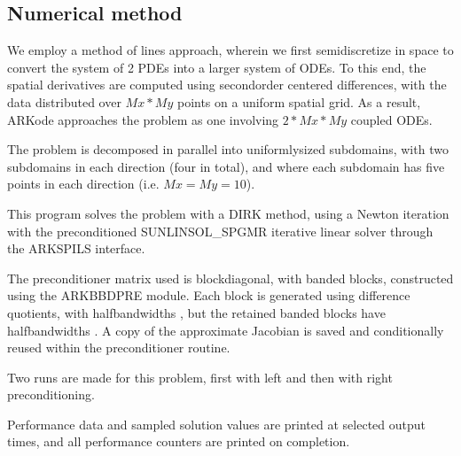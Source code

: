 \documentclass[letterpaper,10pt,english]{sphinxmanual}
\begin{document}
\subsection{Numerical method}
\label{\detokenize{c_parallel:numerical-method}}
\sphinxAtStartPar
We employ a method of lines approach, wherein we first
semi\sphinxhyphen{}discretize in space to convert the system of 2 PDEs into a larger
system of ODEs.  To this end, the spatial derivatives are computed
using second\sphinxhyphen{}order centered differences, with the data distributed
over \(Mx*My\) points on a uniform spatial grid.  As a result, ARKode
approaches the problem as one involving \(2*Mx*My\) coupled ODEs.

\sphinxAtStartPar
The problem is decomposed in parallel into uniformly\sphinxhyphen{}sized subdomains,
with two subdomains in each direction (four in total), and where each
subdomain has five points in each direction (i.e. \(Mx=My=10\)).

\sphinxAtStartPar
This program solves the problem with a DIRK method, using a Newton
iteration with the preconditioned SUNLINSOL\_SPGMR iterative linear
solver through the ARKSPILS interface.

\sphinxAtStartPar
The preconditioner matrix used is block\sphinxhyphen{}diagonal, with banded blocks,
constructed using the ARKBBDPRE module.  Each block is generated using
difference quotients, with half\sphinxhyphen{}bandwidths , but
the retained banded blocks have half\sphinxhyphen{}bandwidths .
A copy of the approximate Jacobian is saved and conditionally reused
within the preconditioner routine.

\sphinxAtStartPar
Two runs are made for this problem, first with left and then with
right preconditioning.

\sphinxAtStartPar
Performance data and sampled solution values are printed at
selected output times, and all performance counters are printed
on completion.
\end{document}
